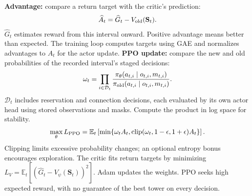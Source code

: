 \documentclass[10pt,a4paper]{article}
\newcommand{\clip}{\operatorname{clip}}
\begin{document}
\textbf{Advantage:} compare a return target with the critic's prediction:
\begin{equation}
\widehat A_t=\widehat G_t-V_{\rm old}(\mathbf S_t).
\end{equation}
$\widehat G_t$ estimates reward from this interval onward. Positive advantage means better than expected. The training loop computes targets using GAE and normalizes advantages to $A_t$ for the actor update.
\textbf{PPO update:} compare the new and old probabilities of the recorded interval's staged decisions:
\begin{equation}
\omega_t=\prod_{i\in\mathcal D_t}
\frac{\pi_{\theta}(a_{t,i}\mid o_{t,i},m_{t,i})}
{\pi_{\rm old}(a_{t,i}\mid o_{t,i},m_{t,i})}.
\end{equation}
$\mathcal D_t$ includes reservation and connection decisions, each evaluated by its own actor head using stored observations and masks. Compute the product in log space for stability.
\begin{equation}
\max_\theta L_{\rm PPO}=\mathbb E_t\left[
\min\{\omega_t A_t,\clip(\omega_t,1-\epsilon,1+\epsilon)A_t\}\right].
\end{equation}
Clipping limits excessive probability changes; an optional entropy bonus encourages exploration. The critic fits return targets by minimizing $L_V=\mathbb E_t[(\widehat G_t-V_\psi(\mathbf S_t))^2]$. Adam updates the weights. PPO seeks high expected reward, with no guarantee of the best tower on every decision.
\end{document}
